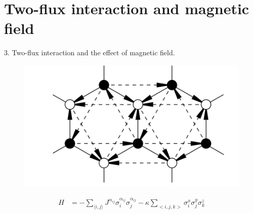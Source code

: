 
\section{Two-flux interaction and magnetic field}

\begin{frame}
    3. Two-flux interaction and the effect of magnetic field.
    \begin{figure}
        \centering
        \begin{minipage}[c]{.5\textwidth}
            \includegraphics[width = .75\textwidth]{figures/three-spin.jpg}
        \end{minipage}
    \end{figure}
    \begingroup
    \small
        \begin{align*}
            H & = -\sum_{\langle i, j\rangle}J^{\alpha_{ij}} \sigma_i^{\alpha_{ij}} \sigma_j^{\alpha_{ij}} - \kappa \sum_{<i,j,k>} \sigma^x_i \sigma^y_j \sigma^z_k 
        \end{align*}
    \endgroup
\end{frame}

